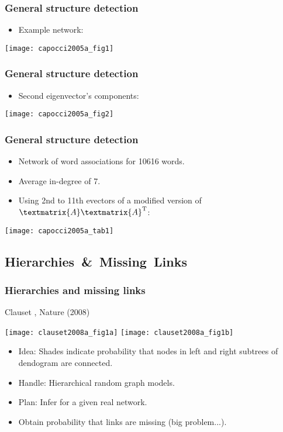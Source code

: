 \begin{frame}
  \frametitle{General structure detection}

  \begin{itemize}
  \item Example network:
  \end{itemize}

  \texttt{[image: capocci2005a\_fig1]}

\end{frame}

\begin{frame}
  \frametitle{General structure detection}

  \begin{itemize}
  \item 
    Second eigenvector's components:
  \end{itemize}

  \texttt{[image: capocci2005a\_fig2]}

\end{frame}

\begin{frame}
  \frametitle{General structure detection}

  \begin{itemize}
  \item
    Network of word associations for 10616 words.
  \item
    Average in-degree of 7.
  \item 
    Using 2nd to 11th evectors of a modified
    version of $\textmatrix{A} \textmatrix{A}^{\textnormal{T}}$:
  \end{itemize}

  \texttt{[image: capocci2005a\_tab1]}

\end{frame}

\subsection{Hierarchies\ \&\ Missing\ Links}

\begin{frame}
  \frametitle{Hierarchies and missing links}

  Clauset \etal, Nature (2008)\cite{clauset2008a}

  \texttt{[image: clauset2008a\_fig1a]}
  \texttt{[image: clauset2008a\_fig1b]}

  \begin{itemize}
  \item<1->
    Idea: Shades indicate probability that nodes in 
    left and right subtrees of 
    dendogram are connected.
  \item<2->
    Handle: \alert{Hierarchical random graph models}.
  \item<3->
    Plan: Infer  for a given real network.
  \item<4->
    Obtain probability that links are missing (big problem...).
  \end{itemize}

\end{frame}


